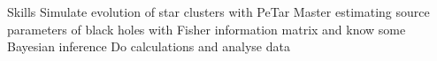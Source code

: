 
\begin{rubric}{Skills}
    Simulate evolution of star clusters with PeTar
    Master estimating source parameters of black holes with Fisher information matrix and know some Bayesian inference
    Do calculations and analyse data
\end{rubric}
